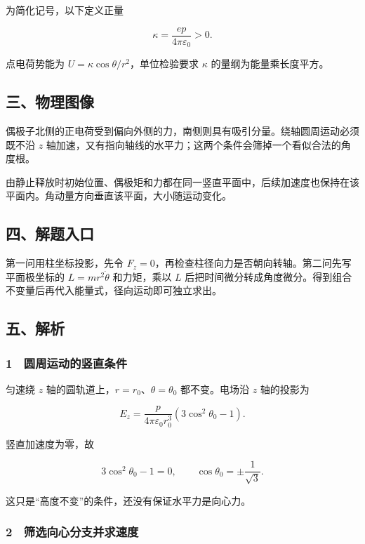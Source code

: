 \documentclass[12pt,a4paper,fontset=fandol]{ctexart}
\begin{document}
为简化记号，以下定义正量

\[\kappa=\frac{ep}{4\pi\varepsilon_0}>0.\]

点电荷势能为 \(U=\kappa\cos\theta/r^2\)，单位检验要求 \(\kappa\)
的量纲为能量乘长度平方。

\subsection{三、物理图像}\label{ux4e09ux7269ux7406ux56feux50cf-4}

偶极子北侧的正电荷受到偏向外侧的力，南侧则具有吸引分量。绕轴圆周运动必须既不沿
\(z\)
轴加速，又有指向轴线的水平力；这两个条件会筛掉一个看似合法的角度根。

由静止释放时初始位置、偶极矩和力都在同一竖直平面中，后续加速度也保持在该平面内。角动量方向垂直该平面，大小随运动变化。

\subsection{四、解题入口}\label{ux56dbux89e3ux9898ux5165ux53e3-4}

第一问用柱坐标投影，先令
\(F_z=0\)，再检查柱径向力是否朝向转轴。第二问先写平面极坐标的
\(L=mr^2\dot\theta\) 和力矩，乘以 \(L\)
后把时间微分转成角度微分。得到组合不变量后再代入能量式，径向运动即可独立求出。

\subsection{五、解析}\label{ux4e94ux89e3ux6790-4}

\subsubsection{1　圆周运动的竖直条件}\label{ux5706ux5468ux8fd0ux52a8ux7684ux7ad6ux76f4ux6761ux4ef6}

匀速绕 \(z\) 轴的圆轨道上，\(r=r_0\)、\(\theta=\theta_0\) 都不变。电场沿
\(z\) 轴的投影为

\[E_z=\frac p{4\pi\varepsilon_0r_0^3}
(3\cos^2\theta_0-1).\]

竖直加速度为零，故

\[3\cos^2\theta_0-1=0,\qquad
\cos\theta_0=\pm\frac1{\sqrt3}.\]

这只是``高度不变''的条件，还没有保证水平力是向心力。

\subsubsection{2　筛选向心分支并求速度}\label{ux7b5bux9009ux5411ux5fc3ux5206ux652fux5e76ux6c42ux901fux5ea6}
\end{document}

